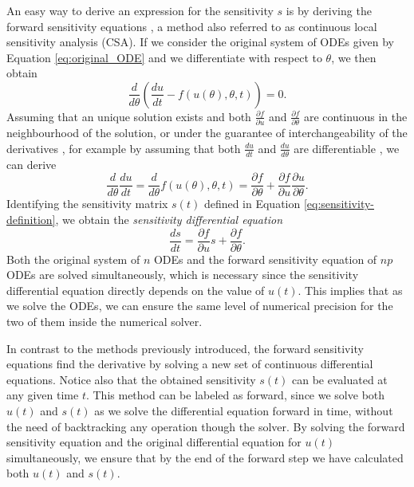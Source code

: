 An easy way to derive an expression for the sensitivity $s$ is by deriving the forward sensitivity equations \cite{ramsay2017dynamic}, a method also referred to as continuous local sensitivity analysis (CSA). 
If we consider the original system of ODEs given by Equation \eqref{eq:original_ODE} and we differentiate with respect to $\theta$, we then obtain
\begin{equation}
    \frac{d}{d\theta} \left( \frac{du}{dt}  - f(u(\theta), \theta, t) \right) = 0.
\end{equation}
Assuming that an unique solution exists and both $\frac{\partial f}{\partial u}$ and $\frac{\partial f}{\partial \theta}$ are continuous in the neighbourhood of the solution, or under the guarantee of interchangeability of the derivatives \cite{gronwall1919note}, for example by assuming that both $\frac{du}{dt}$ and $\frac{du}{d\theta}$ are differentiable \cite{math8111947}, we can derive
\begin{equation}
 \frac{d}{d\theta} \frac{du}{dt} 
 =
 \frac{d}{d\theta} f(u(\theta), \theta, t)
 = 
 \frac{\partial f}{\partial \theta}
 + 
 \frac{\partial f}{\partial u} \frac{\partial u}{\partial \theta}.
\end{equation}
Identifying the sensitivity matrix $s(t)$ defined in Equation \eqref{eq:sensitivity-definition}, we obtain the \textit{sensitivity differential equation} 
\begin{equation}
 \frac{ds}{dt} = \frac{\partial f}{\partial u} s + \frac{\partial f}{\partial \theta}.
 \label{eq:sensitivity_equations}
\end{equation}
Both the original system of $n$ ODEs and the forward sensitivity equation of $np$ ODEs are solved simultaneously, which is necessary since the sensitivity differential equation directly depends on the value of $u(t)$.  
This implies that as we solve the ODEs, we can ensure the same level of numerical precision for the two of them inside the numerical solver.

In contrast to the methods previously introduced, the forward sensitivity equations find the derivative by solving a new set of continuous differential equations.
Notice also that the obtained sensitivity $s(t)$ can be evaluated at any given time $t$. 
This method can be labeled as forward, since we solve both $u(t)$ and $s(t)$ as we solve the differential equation forward in time, without the need of backtracking any operation though the solver.
By solving the forward sensitivity equation and the original differential equation for $u(t)$ simultaneously, we ensure that by the end of the forward step we have calculated both $u(t)$ and $s(t)$. 